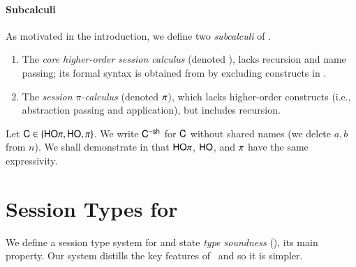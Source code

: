 \documentclass[runningheads]{llncs}
\begin{document}


\paragraph{Subcalculi}
\noi As motivated in the introduction, 
we define two \emph{subcalculi} of \HOp. 
\begin{enumerate}[$\bullet$]
	\item	The  
		{\em core higher-order session calculus} (denoted \HO),
		 lacks recursion and name passing; its 
		formal syntax is obtained from  by excluding 
		constructs in .

	\item	The   
		 {\em session $\pi$-calculus} 
		(denoted $\pi$), which 
		lacks  
		higher-order constructs
		(i.e., abstraction passing and application), but includes recursion.

\end{enumerate}
%
Let $\mathsf{C} \in \{\mathsf{HO}\pi, \mathsf{HO}, \pi\}$. We write 
$\mathsf{C}^{-\mathsf{sh}}$ for $\mathsf{C}$ without shared names
(we delete $a,b$ from $n$). 
We shall demonstrate in  that 
$\mathsf{HO}\pi$, $\mathsf{HO}$, and $\pi$ have the same expressivity.



\section{Session Types for \HOp}
\label{sec:types}

We define a session type system for \HOp and state
\emph{type soundness} (), 
its main property.
Our system distills the key features of~\cite{tlca07,MostrousY15} and so it is simpler.
\end{document}

